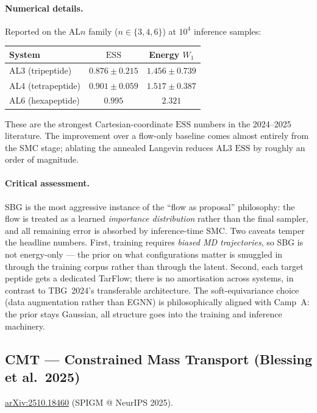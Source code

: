 \documentclass[11pt,letterpaper]{article}
\newcommand{\ESS}{\mathrm{ESS}}
\theoremstyle{plain}
\begin{document}
\paragraph{Numerical details.} Reported on the AL$n$ family
($n\in\{3,4,6\}$) at $10^4$ inference samples:
\begin{center}\small
\begin{tabular}{lcc}
\toprule
System & $\ESS$ & Energy $W_1$ \\
\midrule
AL3 (tripeptide)   & $0.876\pm 0.215$ & $1.456\pm 0.739$ \\
AL4 (tetrapeptide) & $0.901\pm 0.059$ & $1.517\pm 0.387$ \\
AL6 (hexapeptide)  & $0.995$          & $2.321$ \\
\bottomrule
\end{tabular}
\end{center}
These are the strongest Cartesian-coordinate $\ESS$ numbers in the
2024--2025 literature. The improvement over a flow-only baseline comes
almost entirely from the SMC stage; ablating the annealed Langevin reduces
AL3 $\ESS$ by roughly an order of magnitude.

\paragraph{Critical assessment.} SBG is the most aggressive instance of the
``flow as proposal'' philosophy: the flow is treated as a learned
\emph{importance distribution} rather than the final sampler, and all
remaining error is absorbed by inference-time SMC. Two caveats temper the
headline numbers. First, training requires \emph{biased MD trajectories}, so
SBG is not energy-only --- the prior on what configurations matter is
smuggled in through the training corpus rather than through the latent.
Second, each target peptide gets a dedicated TarFlow; there is no
amortisation across systems, in contrast to TBG~2024's transferable
architecture. The soft-equivariance choice (data augmentation rather than
EGNN) is philosophically aligned with Camp~A: the prior stays Gaussian, all
structure goes into the training and inference machinery.

\subsection{CMT --- Constrained Mass Transport (Blessing et al.\ 2025)}

\href{https://arxiv.org/abs/2510.18460}{arXiv:2510.18460}
(SPIGM @ NeurIPS 2025).
\end{document}
